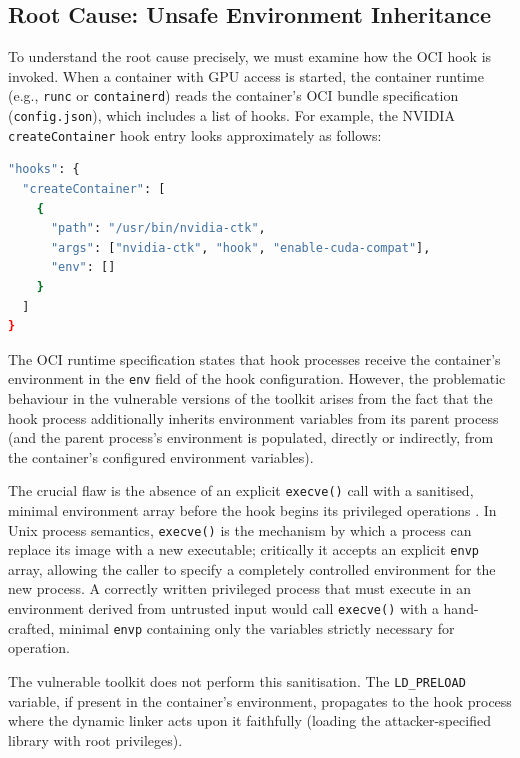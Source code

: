 \subsection{Root Cause: Unsafe Environment Inheritance}
\label{subsec:root-cause}

To understand the root cause precisely, we must examine how the OCI hook is invoked. When a container with GPU access is started, the container runtime (e.g., \texttt{runc} or \texttt{containerd}) reads the container's OCI bundle specification (\texttt{config.json}), which includes a list of hooks. For example, the NVIDIA \texttt{createContainer} hook entry looks approximately as follows:

\begin{lstlisting}[language=bash, caption={Simplified OCI hook specification for nvidia-ctk (config.json excerpt).}]
"hooks": {
  "createContainer": [
    {
      "path": "/usr/bin/nvidia-ctk",
      "args": ["nvidia-ctk", "hook", "enable-cuda-compat"],
      "env": []
    }
  ]
}
\end{lstlisting}

The OCI runtime specification states that hook processes receive the container's environment in the \texttt{env} field of the hook configuration. However, the problematic behaviour in the vulnerable versions of the toolkit arises from the fact that the hook process additionally inherits environment variables from its parent process (and the parent process's environment is populated, directly or indirectly, from the container's configured environment variables).
 
The crucial flaw is the absence of an explicit \texttt{execve()} call with a sanitised, minimal environment array before the hook begins its privileged operations \cite{linux_execve_manpage}. In Unix process semantics, \texttt{execve()} is the mechanism by which a process can replace its image with a new executable; critically it accepts an explicit \texttt{envp} array, allowing the caller to specify a completely controlled environment for the new process. A correctly written privileged process that must execute in an environment derived from untrusted input would call \texttt{execve()} with a hand-crafted, minimal \texttt{envp} containing only the variables strictly necessary for operation.

The vulnerable toolkit does not perform this sanitisation. The \texttt{LD\_PRELOAD} variable, if present in the container's environment, propagates to the hook process where the dynamic linker acts upon it faithfully \cite{linux_ldso_manpage} (loading the attacker-specified library with root privileges).

